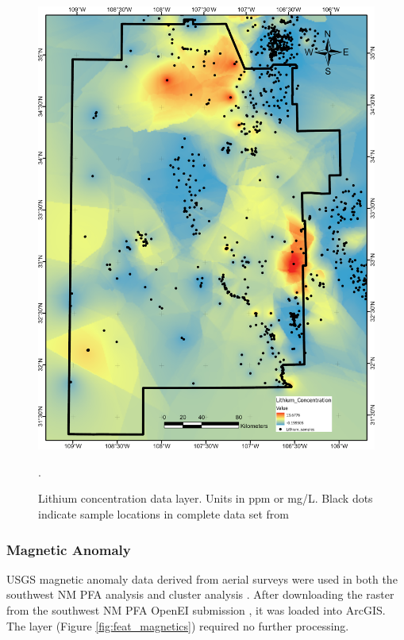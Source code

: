 \begin{figure}[!htp]
\centering
\includegraphics[scale=.50]{templates/images/Figure-Lithium.png}
\caption[Lithium concentration data layer]{Lithium concentration data layer. Units in ppm or mg/L. Black dots indicate sample locations in complete data set from \protect\citep{bielicki_hydrogeolgic_2015}}.
\label{fig:feat_lithium}
\end{figure}

\subsubsection{Magnetic Anomaly}

USGS magnetic anomaly data derived from aerial surveys \citep{bankey_digital_2002} were used in both the southwest NM PFA analysis \citep{bielicki_hydrogeolgic_2015} and cluster analysis \citep{pepin_new_2018}. After downloading the raster from the southwest NM PFA OpenEI submission \citep{kelley_geothermal_2015}, it was loaded into ArcGIS. The layer (Figure \ref{fig:feat_magnetics}) required no further processing.

